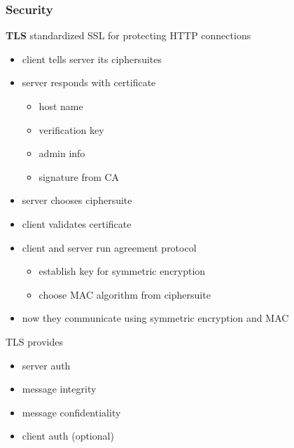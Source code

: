 \documentclass[]{article}
\theoremstyle{definition}
\begin{document}
	\subsubsection{Security}
	\textbf{TLS} standardized SSL for protecting HTTP connections
	\begin{itemize}
		\item client tells server its ciphersuites
		\item server responds with certificate
			\begin{itemize}
				\item host name
				\item verification key
				\item admin info
				\item signature from CA
			\end{itemize}
		\item server chooses ciphersuite
		\item client validates certificate
		\item client and server run agreement protocol
			\begin{itemize}
				\item establish key for symmetric encryption
				\item choose MAC algorithm from ciphersuite
			\end{itemize}
		\item now they communicate using symmetric encryption and MAC
	\end{itemize}
	TLS provides
	\begin{itemize}
		\item server auth
		\item message integrity
		\item message confidentiality
		\item client auth (optional)
	\end{itemize}
\end{document}
